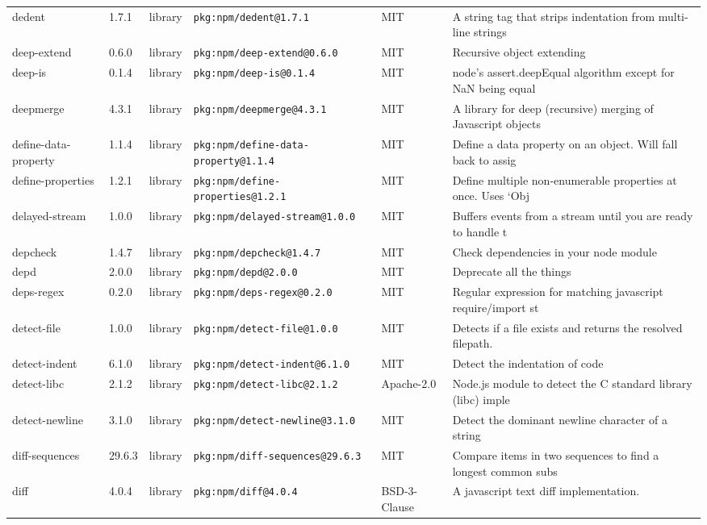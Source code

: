 \documentclass[11pt]{article}
\begin{document}
\begin{longtable}{|l|l|l|p{2.2cm}|l|p{4cm}|}
dedent & 1.7.1 & library & \texttt{pkg:npm/dedent@1.7.1} & MIT & A string tag that strips indentation from multi-line strings \\
deep-extend & 0.6.0 & library & \texttt{pkg:npm/deep-extend@0.6.0} & MIT & Recursive object extending \\
deep-is & 0.1.4 & library & \texttt{pkg:npm/deep-is@0.1.4} & MIT & node's assert.deepEqual algorithm except for NaN being equal \\
deepmerge & 4.3.1 & library & \texttt{pkg:npm/deepmerge@4.3.1} & MIT & A library for deep (recursive) merging of Javascript objects \\
define-data-property & 1.1.4 & library & \texttt{pkg:npm/define-data-property@1.1.4} & MIT & Define a data property on an object. Will fall back to assig \\
define-properties & 1.2.1 & library & \texttt{pkg:npm/define-properties@1.2.1} & MIT & Define multiple non-enumerable properties at once. Uses `Obj \\
delayed-stream & 1.0.0 & library & \texttt{pkg:npm/delayed-stream@1.0.0} & MIT & Buffers events from a stream until you are ready to handle t \\
depcheck & 1.4.7 & library & \texttt{pkg:npm/depcheck@1.4.7} & MIT & Check dependencies in your node module \\
depd & 2.0.0 & library & \texttt{pkg:npm/depd@2.0.0} & MIT & Deprecate all the things \\
deps-regex & 0.2.0 & library & \texttt{pkg:npm/deps-regex@0.2.0} & MIT & Regular expression for matching javascript require/import st \\
detect-file & 1.0.0 & library & \texttt{pkg:npm/detect-file@1.0.0} & MIT & Detects if a file exists and returns the resolved filepath. \\
detect-indent & 6.1.0 & library & \texttt{pkg:npm/detect-indent@6.1.0} & MIT & Detect the indentation of code \\
detect-libc & 2.1.2 & library & \texttt{pkg:npm/detect-libc@2.1.2} & Apache-2.0 & Node.js module to detect the C standard library (libc) imple \\
detect-newline & 3.1.0 & library & \texttt{pkg:npm/detect-newline@3.1.0} & MIT & Detect the dominant newline character of a string \\
diff-sequences & 29.6.3 & library & \texttt{pkg:npm/diff-sequences@29.6.3} & MIT & Compare items in two sequences to find a longest common subs \\
diff & 4.0.4 & library & \texttt{pkg:npm/diff@4.0.4} & BSD-3-Clause & A javascript text diff implementation. \\

\end{longtable}
\end{document}
